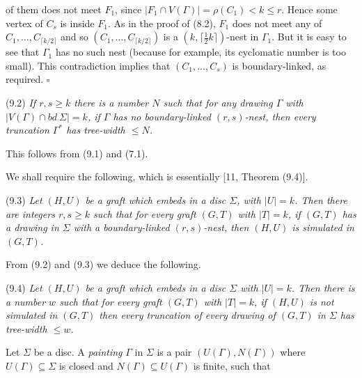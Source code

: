 \noindent of them does not meet $F_1$, since $|F_1 \cap V(\Gamma)| = \rho(C_1) < k \le r$. Hence some vertex of $C_s$ is inside $F_1$. As in the proof of (8.2), $F_1$ does not meet any of $C_1, \dots, C_{\lceil k/2 \rceil}$ and so $(C_1, \dots, C_{\lceil k/2 \rceil})$ is a $(k, \lceil \frac{1}{2}k \rceil)$-nest in $\Gamma_1$. But it is easy to see that $\Gamma_1$ has no such nest (because for example, its cyclomatic number is too small). This contradiction implies that $(C_1, \dots, C_s)$ is boundary-linked, as required. $\square$

\stmt
(9.2) \textit{If $r, s \ge k$ there is a number $N$ such that for any drawing $\Gamma$ with $|V(\Gamma) \cap bd\ \Sigma| = k$, if $\Gamma$ has no boundary-linked $(r, s)$-nest, then every truncation $\Gamma^*$ has tree-width $\le N$.}

This follows from (9.1) and (7.1).

We shall require the following, which is essentially [11, Theorem (9.4)].

\stmt
(9.3) \textit{Let $(H, U)$ be a graft which embeds in a disc $\Sigma$, with $|U| = k$. Then there are integers $r, s \ge k$ such that for every graft $(G, T)$ with $|T| = k$, if $(G, T)$ has a drawing in $\Sigma$ with a boundary-linked $(r, s)$-nest, then $(H, U)$ is simulated in $(G, T)$.}

From (9.2) and (9.3) we deduce the following.

\stmt
(9.4) \textit{Let $(H, U)$ be a graft which embeds in a disc $\Sigma$ with $|U| = k$. Then there is a number $w$ such that for every graft $(G, T)$ with $|T| = k$, if $(H, U)$ is not simulated in $(G, T)$ then every truncation of every drawing of $(G, T)$ in $\Sigma$ has tree-width $\le w$.}


Let $\Sigma$ be a disc. A \textit{painting} $\Gamma$ in $\Sigma$ is a pair $(U(\Gamma), N(\Gamma))$ where $U(\Gamma) \subseteq \Sigma$ is closed and $N(\Gamma) \subseteq U(\Gamma)$ is finite, such that

